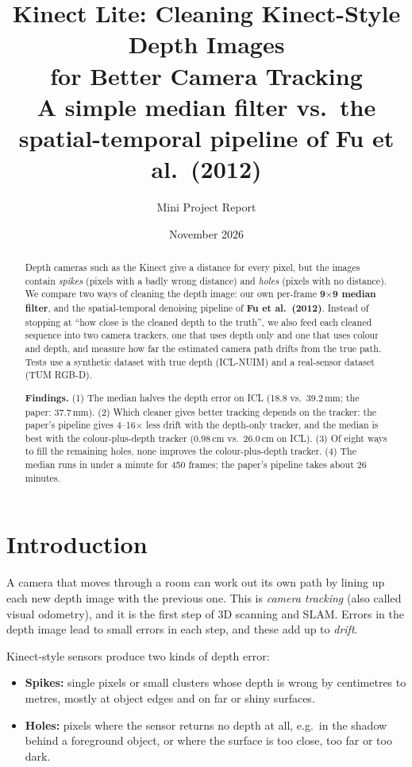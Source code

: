 \documentclass[11pt,a4paper]{article}
\title{\textbf{Kinect Lite: Cleaning Kinect-Style Depth Images\\for Better Camera Tracking}\\[4pt]
\large A simple median filter vs.\ the spatial-temporal pipeline of Fu et al.\ (2012)}
\author{Mini Project Report}
\date{November 2026}
\newcommand{\cm}{\,cm\xspace}
\newcommand{\mm}{\,mm\xspace}
\begin{document}
\maketitle

\begin{abstract}
\noindent
Depth cameras such as the Kinect give a distance for every pixel, but the images contain
\emph{spikes} (pixels with a badly wrong distance) and \emph{holes} (pixels with no distance).
We compare two ways of cleaning the depth image: our own per-frame \textbf{9$\times$9 median filter}, and
the spatial-temporal denoising pipeline of \textbf{Fu et al.\ (2012)}. Instead of stopping at
``how close is the cleaned depth to the truth'', we also feed each cleaned sequence into two camera trackers,
one that uses depth only and one that uses colour and depth, and measure how far the estimated camera path drifts
from the true path. Tests use a synthetic dataset with true depth (ICL-NUIM) and a real-sensor dataset (TUM RGB-D).

\smallskip\noindent
\textbf{Findings.} (1) The median halves the depth error on ICL (18.8 vs.\ 39.2\mm; the paper: 37.7\mm).
(2) Which cleaner gives better tracking depends on the tracker: the paper's pipeline gives 4--16$\times$ less
drift with the depth-only tracker, and the median is best with the colour-plus-depth tracker (0.98\cm vs.\ 26.0\cm on ICL).
(3) Of eight ways to fill the remaining holes, none improves the colour-plus-depth tracker.
(4) The median runs in under a minute for 450 frames; the paper's pipeline takes about 26 minutes.
\end{abstract}

\section{Introduction}

A camera that moves through a room can work out its own path by lining up each new depth image with the previous one.
This is \emph{camera tracking} (also called visual odometry), and it is the first step of 3D scanning and
SLAM. Errors in the depth image lead to small errors in each step, and these add up to \emph{drift}.

Kinect-style sensors produce two kinds of depth error:
\begin{itemize}
  \item \textbf{Spikes:} single pixels or small clusters whose depth is wrong by centimetres to metres,
        mostly at object edges and on far or shiny surfaces.
  \item \textbf{Holes:} pixels where the sensor returns no depth at all, e.g.\ in the shadow behind a
        foreground object, or where the surface is too close, too far or too dark.
\end{itemize}
\end{document}
